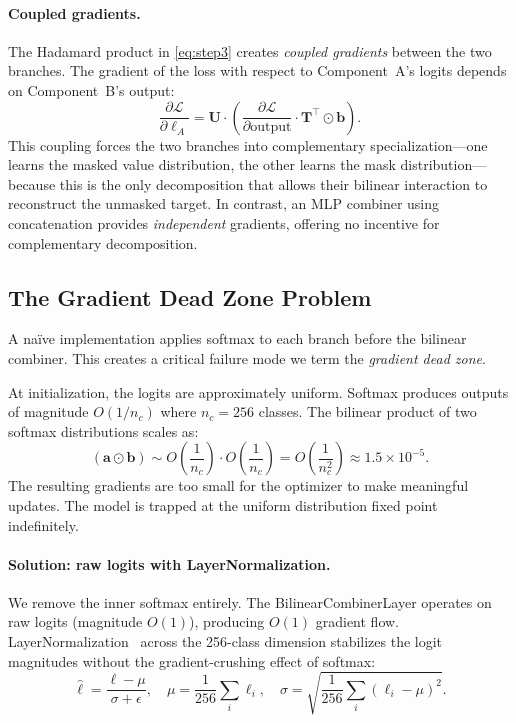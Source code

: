 \documentclass[submission]{iacrtrans}
\begin{document}
\paragraph{Coupled gradients.} The Hadamard product in \cref{eq:step3} creates \emph{coupled gradients} between the two branches. The gradient of the loss with respect to Component~A's logits depends on Component~B's output:
\begin{equation}
  \frac{\partial \mathcal{L}}{\partial \bm{\ell}_A} = \bm{U} \cdot \left(\frac{\partial \mathcal{L}}{\partial \text{output}} \cdot \bm{T}^\top \odot \bm{b}\right).
\end{equation}
This coupling forces the two branches into complementary specialization---one learns the masked value distribution, the other learns the mask distribution---because this is the only decomposition that allows their bilinear interaction to reconstruct the unmasked target. In contrast, an MLP combiner using concatenation provides \emph{independent} gradients, offering no incentive for complementary decomposition.

\subsection{The Gradient Dead Zone Problem}\label{sec:deadzone}

A na\"ive implementation applies softmax to each branch before the bilinear combiner. This creates a critical failure mode we term the \emph{gradient dead zone}.

At initialization, the logits are approximately uniform. Softmax produces outputs of magnitude $O(1/n_c)$ where $n_c = 256$ classes. The bilinear product of two softmax distributions scales as:
\begin{equation}
  (\bm{a} \odot \bm{b}) \sim O\left(\frac{1}{n_c}\right) \cdot O\left(\frac{1}{n_c}\right) = O\left(\frac{1}{n_c^2}\right) \approx 1.5 \times 10^{-5}.
\end{equation}
The resulting gradients are too small for the optimizer to make meaningful updates. The model is trapped at the uniform distribution fixed point indefinitely.

\paragraph{Solution: raw logits with LayerNormalization.} We remove the inner softmax entirely. The BilinearCombinerLayer operates on raw logits (magnitude $O(1)$), producing $O(1)$ gradient flow. LayerNormalization~\cite{ba2016layer} across the 256-class dimension stabilizes the logit magnitudes without the gradient-crushing effect of softmax:
\begin{equation}
  \hat{\bm{\ell}} = \frac{\bm{\ell} - \mu}{\sigma + \epsilon}, \quad \mu = \frac{1}{256}\sum_i \ell_i, \quad \sigma = \sqrt{\frac{1}{256}\sum_i (\ell_i - \mu)^2}.
\end{equation}
\end{document}
